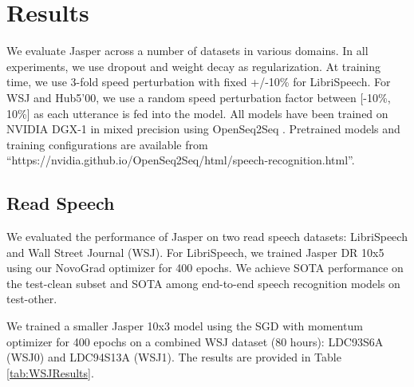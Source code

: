 \documentclass[a4paper]{article}
\begin{document}
\section{Results}
We evaluate Jasper across a number of datasets in various domains. In all experiments, we use dropout and weight decay as regularization. At training time, we use 3-fold speed perturbation with fixed +/-10\% \cite{Ko2015} for LibriSpeech. For WSJ and Hub5'00, we use a random speed perturbation factor between [-10\%, 10\%] as each utterance is fed into the model. All models have been trained on NVIDIA DGX-1 in mixed precision \cite{micikevicius2017mixed} using OpenSeq2Seq \cite{OpenSeq2Seq}. Pretrained models and training configurations are available from ``https://nvidia.github.io/OpenSeq2Seq/html/speech-recognition.html''.

\subsection{Read Speech}

We evaluated the performance of Jasper on two read speech datasets: LibriSpeech and Wall Street Journal (WSJ). For LibriSpeech, we trained Jasper DR 10x5 using our NovoGrad optimizer for 400 epochs. We achieve SOTA performance on the test-clean subset and SOTA among end-to-end speech recognition models on test-other.

We trained a smaller Jasper 10x3 model using the SGD with momentum optimizer for 400 epochs on a combined WSJ dataset (80 hours): LDC93S6A (WSJ0) and LDC94S13A (WSJ1). The results are provided in Table \ref{tab:WSJResults}.

\begin{table}[!h]
\centering
\caption{WSJ End-to-End Models, WER (\%)}
\label{tab:WSJResults}
\end{table}
\end{document}
